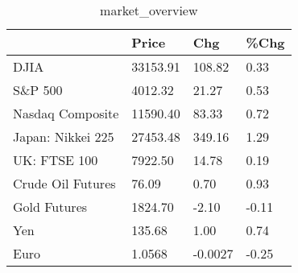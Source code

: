 \documentclass{article}%
\begin{document}
%


\begin{table}[htbp]%
\caption{market\_overview}%
\centering%
\begin{adjustbox}{width=1\textwidth}%
\begin{tabular}{llll}
\toprule
                  &    Price &     Chg &  \%Chg \\
\midrule
             DJIA & 33153.91 &  108.82 &  0.33 \\
          S\&P 500 &  4012.32 &   21.27 &  0.53 \\
 Nasdaq Composite & 11590.40 &   83.33 &  0.72 \\
Japan: Nikkei 225 & 27453.48 &  349.16 &  1.29 \\
     UK: FTSE 100 &  7922.50 &   14.78 &  0.19 \\
Crude Oil Futures &    76.09 &    0.70 &  0.93 \\
     Gold Futures &  1824.70 &   -2.10 & -0.11 \\
              Yen &   135.68 &    1.00 &  0.74 \\
             Euro &   1.0568 & -0.0027 & -0.25 \\
\bottomrule
\end{tabular}
%
\end{adjustbox}%
\end{table}

%
\end{document}
